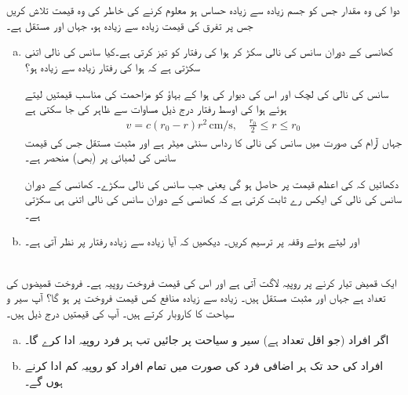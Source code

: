 \\
\\
دوا کی وہ مقدار جس کو جسم زیادہ سے زیادہ حساس ہو معلوم کرنے کی خاطر  کی وہ قیمت تلاش کریں جس پر تفرق  کی قیمت زیادہ سے زیادہ ہو، جہاں  اور  مستقل ہے۔
\begin{enumerate}[a.]
\item
کھانسی کے دوران سانس کی نالی سکڑ کر ہوا کی رفتار کو تیز کرتی ہے۔کیا سانس کی نالی اتنی سکڑتی ہے کہ ہوا کی رفتار زیادہ سے زیادہ ہو؟

سانس کی نالی کی لچک اور اس کی دیوار کی ہوا کے بہاؤ  کو مزاحمت کی  مناسب قیمتیں لیتے ہوئے ہوا کی اوسط رفتار  درج ذیل مساوات سے ظاہر کی جا سکتی ہے
\begin{align*}
v=c(r_0-r)r^2\,\si{\centi\meter\per\second},\quad \frac{r_0}{2}\le r\le r_0
\end{align*}
جہاں آرام کی صورت میں سانس کی نالی کا رداس  سنٹی میٹر ہے اور  مثبت مستقل جس کی قیمت سانس کی لمبائی پر (بھی) منحصر ہے۔

دکھائیں کہ  کی اعظم قیمت  پر حاصل ہو گی یعنی جب سانس کی نالی  سکڑے۔ کھانسی کے دوران سانس کی نالی کی  ایکس رے ثابت کرتی ہے کہ کھانسی کے دوران سانس  کی نالی اتنی ہی سکڑتی ہے۔ 
\item
{} اور  لیتے ہوئے وقفہ  پر  ترسیم کریں۔ دیکھیں کہ آیا زیادہ سے زیادہ رفتار  پر نظر آتی ہے۔
\end{enumerate}
\\
ایک قمیض تیار کرنے پر  روپیہ لاگت آتی ہے اور اس کی قیمت فروخت  روپیہ ہے۔ فروخت قمیضوں کی تعداد   ہے جہاں  اور  مثبت مستقل ہیں۔ زیادہ سے زیادہ منافع کس قیمت فروخت پر ہو گا؟
آپ سیر و سیاحت کا کاروبار کرتے ہیں۔ آپ کی قیمتیں درج ذیل ہیں۔
\begin{enumerate}[a.]
\item
اگر  افراد (جو اقل تعداد ہے) سیر و سیاحت پر جائیں تب ہر فرد  روپیہ ادا کرے گا۔  
\item
{} افراد کی حد تک ہر اضافی فرد کی صورت میں تمام افراد کو  روپیہ کم ادا کرنے ہوں گے۔ 
\end{enumerate}
